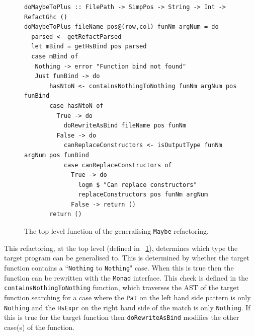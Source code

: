 \DIFaddend \begin{figure}[t]
\DIFdelbeginFL %
\DIFdelendFL \DIFaddbeginFL \begin{lstlisting}
doMaybeToPlus :: FilePath -> SimpPos -> String -> Int -> RefactGhc ()  
doMaybeToPlus fileName pos@(row,col) funNm argNum = do
  parsed <- getRefactParsed
  let mBind = getHsBind pos parsed
  case mBind of
   Nothing -> error "Function bind not found"
   Just funBind -> do
       hasNtoN <- containsNothingToNothing funNm argNum pos funBind
       case hasNtoN of
         True -> do
           doRewriteAsBind fileName pos funNm
         False -> do 
           canReplaceConstructors <- isOutputType funNm argNum pos funBind
           case canReplaceConstructors of
             True -> do
               logm $ "Can replace constructors"
               replaceConstructors pos funNm argNum
             False -> return ()
       return ()
\end{lstlisting} 
\DIFaddendFL \caption{The top level function of the generalising \texttt{Maybe} refactoring.}
\label{genMaybeTopLevel}
\end{figure}

This refactoring, at the top level (defined in \DIFdelbegin {}\DIFdelend \DIFaddbegin {}\DIFaddend ~\ref{genMaybeTopLevel}), determines which type the target program can be generalised to. This is determined by whether the target function contains a ``\texttt{Nothing} to \texttt{Nothing}" case. When this is true then the function can be rewritten with the \texttt{Monad} interface. This check is defined in the \texttt{containsNothingToNothing} function, which traverses the AST of the target function searching for a case where the \texttt{Pat} on the left hand side pattern is only \texttt{Nothing} and the \texttt{HsExpr} on the right hand side of the match is only \texttt{Nothing}. If this is true for the target function then \texttt{doRewriteAsBind} modifies the other case(s) of the function.

